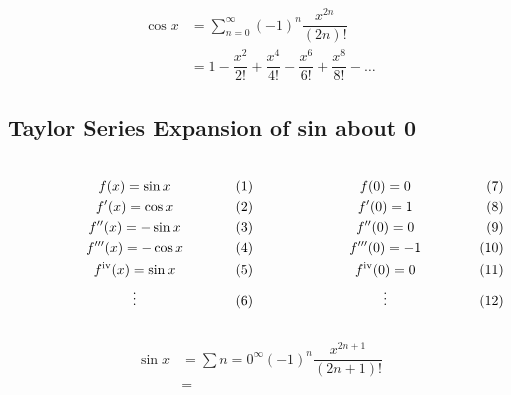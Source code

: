 \documentclass{article}
\begin{document}
\begin{align*}
	\cos x &= \sum_{n=0}^{\infty}(-1)^n\dfrac{x^{2n}}{(2n)!}\\
		   &= 1 - \dfrac{x^2}{2!}+\dfrac{x^4}{4!}-\dfrac{x^6}{6!}+\dfrac{x^8}{8!}-\dots
\end{align*}

\subsection{Taylor Series Expansion of sin about 0}

$\begin{array}{c c}
	\parbox[c]{0.5\textwidth}{
	\begin{gather*}
		f(x) = \sin x\\
		f'(x) = \cos x\\
		f''(x) = -\sin x\\
		f'''(x) = -\cos x\\
		f^{\text{iv}}(x) = \sin x\\
		\vdots
	\end{gather*}}
&
	\parbox[c]{0.5\textwidth}{
	\begin{gather*}
		f(0) = 0\\
		f'(0) = 1\\
		f''(0) = 0\\
		f'''(0) = -1\\
		f^{\text{iv}}(0) = 0\\
		\vdots
	\end{gather*}}
\end{array}$

\begin{align*}
	\sin x &= \sum{n=0}^{\infty}(-1)^n\dfrac{x^{2n+1}}{(2n+1)!}\\
		   &=
\end{align*}
\end{document}
